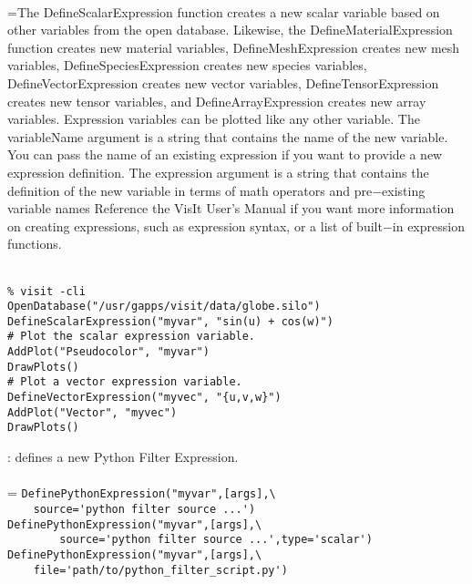 \documentclass[10pt,a4paper]{report}
\begin{document}
 \\ 
\hangindent=\parindent The DefineScalarExpression function creates a new scalar variable based on other variables from the open database. Likewise, the DefineMaterialExpression function creates new material variables, DefineMeshExpression creates new mesh variables, DefineSpeciesExpression creates new species variables, DefineVectorExpression creates new vector variables, DefineTensorExpression creates new tensor variables, and DefineArrayExpression creates new array variables. Expression variables can be plotted like any other variable. The variableName argument is a string that contains the name of the new variable. You can pass the name of an existing expression if you want to provide a new expression definition. The expression argument is a string that contains the definition of the new variable in terms of math operators and pre$-$existing variable names Reference the VisIt User's Manual if you want more information on  creating expressions, such as expression syntax, or a list of built$-$in expression functions. \\[-3mm] 

\\[-6mm]
\begin{verbatim}% visit -cli
OpenDatabase("/usr/gapps/visit/data/globe.silo")
DefineScalarExpression("myvar", "sin(u) + cos(w)")
# Plot the scalar expression variable.
AddPlot("Pseudocolor", "myvar")
DrawPlots()
# Plot a vector expression variable.
DefineVectorExpression("myvec", "{u,v,w}")
AddPlot("Vector", "myvec")
DrawPlots()
\end{verbatim}
\newpage


{}
: defines a new Python Filter Expression.\\[-3mm]

 \\ 
\hangindent=\parindent
\verb!DefinePythonExpression("myvar",[args],\ ! \\ 
\verb!    source='python filter source ...')!\\
\verb!DefinePythonExpression("myvar",[args],\ ! \\ 
\verb!        source='python filter source ...',type='scalar')!\\
\verb!DefinePythonExpression("myvar",[args],\ ! \\ 
\verb!    file='path/to/python_filter_script.py')!\\ [-3mm]
\end{document}
